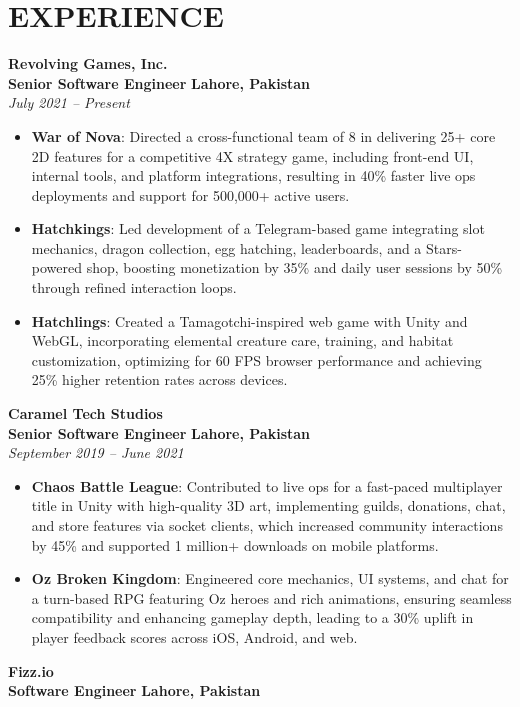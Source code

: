 \documentclass[11pt]{article}
\begin{document}
\section*{EXPERIENCE}
\textbf{Revolving Games, Inc.} \\
\textbf{Senior Software Engineer} \hfill \textbf{Lahore, Pakistan} \\
\textit{July 2021 – Present}
\begin{itemize}
	\item \textbf{War of Nova}: Directed a cross-functional team of 8 in delivering 25+ core 2D features for a competitive 4X strategy game, including front-end UI, internal tools, and platform integrations, resulting in 40\% faster live ops deployments and support for 500,000+ active users.
	\item \textbf{Hatchkings}: Led development of a Telegram-based game integrating slot mechanics, dragon collection, egg hatching, leaderboards, and a Stars-powered shop, boosting monetization by 35\% and daily user sessions by 50\% through refined interaction loops.
	\item \textbf{Hatchlings}: Created a Tamagotchi-inspired web game with Unity and WebGL, incorporating elemental creature care, training, and habitat customization, optimizing for 60 FPS browser performance and achieving 25\% higher retention rates across devices.
\end{itemize}
\textbf{Caramel Tech Studios} \\
\textbf{Senior Software Engineer} \hfill \textbf{Lahore, Pakistan} \\
\textit{September 2019 – June 2021}
\begin{itemize}
	\item \textbf{Chaos Battle League}: Contributed to live ops for a fast-paced multiplayer title in Unity with high-quality 3D art, implementing guilds, donations, chat, and store features via socket clients, which increased community interactions by 45\% and supported 1 million+ downloads on mobile platforms.
	\item \textbf{Oz Broken Kingdom}: Engineered core mechanics, UI systems, and chat for a turn-based RPG featuring Oz heroes and rich animations, ensuring seamless compatibility and enhancing gameplay depth, leading to a 30\% uplift in player feedback scores across iOS, Android, and web.
\end{itemize}
\textbf{Fizz.io} \\
\textbf{Software Engineer} \hfill \textbf{Lahore, Pakistan} \\
\end{document}
